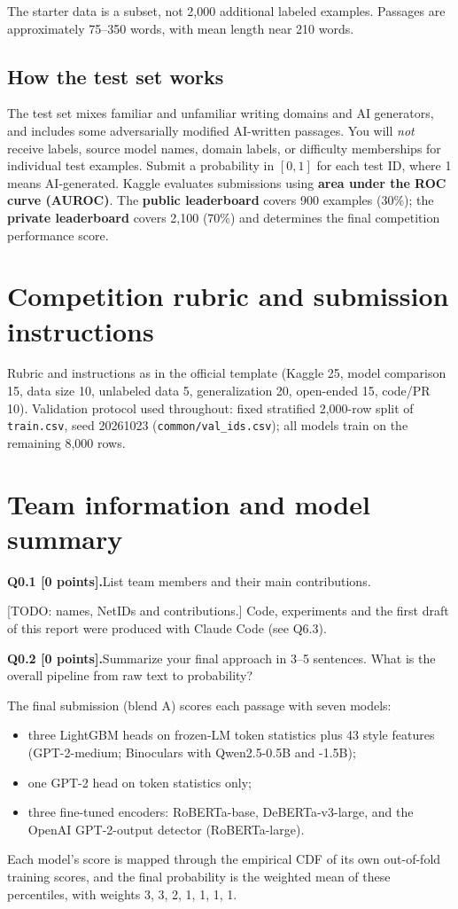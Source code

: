 \documentclass[11pt,letterpaper]{article}
\newcommand{\question}[2]{\needspace{4\baselineskip}\par\addvspace{0.45em}\noindent\textbf{#1}\quad #2\par\nobreak\vspace{0.1em}}
\newcommand{\smallnote}[1]{{\small\color{muted}#1}}
\begin{document}
\smallnote{The starter data is a subset, not 2,000 additional labeled examples. Passages are approximately 75--350 words, with mean length near 210 words.}

\subsection*{How the test set works}
The test set mixes familiar and unfamiliar writing domains and AI generators, and includes some adversarially modified AI-written passages. You will \emph{not} receive labels, source model names, domain labels, or difficulty memberships for individual test examples. Submit a probability in $[0,1]$ for each test ID, where 1 means AI-generated. Kaggle evaluates submissions using \textbf{area under the ROC curve (AUROC)}. The \textbf{public leaderboard} covers 900 examples (30\%); the \textbf{private leaderboard} covers 2,100 (70\%) and determines the final competition performance score.

\vfill
\newpage
\section{Competition rubric and submission instructions}
\smallnote{Rubric and instructions as in the official template (Kaggle 25, model comparison 15, data size 10, unlabeled data 5, generalization 20, open-ended 15, code/PR 10). Validation protocol used throughout: fixed stratified 2,000-row split of \texttt{train.csv}, seed 20261023 (\texttt{common/val\_ids.csv}); all models train on the remaining 8,000 rows.}

\section{Team information and model summary}
\question{Q0.1 [0 points].}{List team members and their main contributions.}
[TODO: names, NetIDs and contributions.] Code, experiments and the first draft of this report were produced with Claude Code (see Q6.3).

\question{Q0.2 [0 points].}{Summarize your final approach in 3--5 sentences. What is the overall pipeline from raw text to probability?}
The final submission (blend A) scores each passage with seven models:
\begin{itemize}
\item three LightGBM heads on frozen-LM token statistics plus 43 style features (GPT-2-medium; Binoculars with Qwen2.5-0.5B and -1.5B);
\item one GPT-2 head on token statistics only;
\item three fine-tuned encoders: RoBERTa-base, DeBERTa-v3-large, and the OpenAI GPT-2-output detector (RoBERTa-large).
\end{itemize}
Each model's score is mapped through the empirical CDF of its own out-of-fold training scores, and the final probability is the weighted mean of these percentiles, with weights 3, 3, 2, 1, 1, 1, 1.
\end{document}
